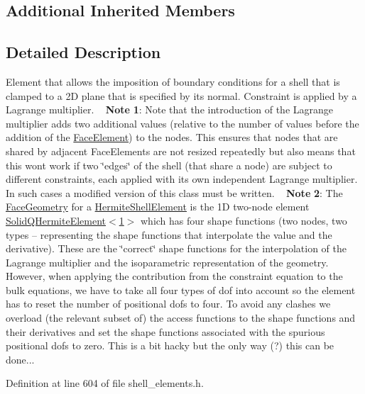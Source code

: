 \subsection*{Additional Inherited Members}


\subsection{Detailed Description}
Element that allows the imposition of boundary conditions for a shell that is clamped to a 2D plane that is specified by its normal. Constraint is applied by a Lagrange multiplier. ~\newline
{\bfseries Note} {\bfseries 1}\+: Note that the introduction of the Lagrange multiplier adds two additional values (relative to the number of values before the addition of the \hyperlink{classoomph_1_1FaceElement}{Face\+Element}) to the nodes. This ensures that nodes that are shared by adjacent Face\+Elements are not resized repeatedly but also means that this won\textquotesingle{}t work if two \char`\"{}edges\char`\"{} of the shell (that share a node) are subject to different constraints, each applied with its own independent Lagrange multiplier. In such cases a modified version of this class must be written. ~\newline
 {\bfseries Note} {\bfseries 2}\+: The \hyperlink{classoomph_1_1FaceGeometry}{Face\+Geometry} for a \hyperlink{classoomph_1_1HermiteShellElement}{Hermite\+Shell\+Element} is the 1D two-\/node element \hyperlink{classoomph_1_1SolidQHermiteElement}{Solid\+Q\+Hermite\+Element$<$1$>$} which has four shape functions (two nodes, two types -- representing the shape functions that interpolate the value and the derivative). These are the \char`\"{}correct\char`\"{} shape functions for the interpolation of the Lagrange multiplier and the isoparametric representation of the geometry. However, when applying the contribution from the constraint equation to the bulk equations, we have to take all four types of dof into account so the element has to reset the number of positional dofs to four. To avoid any clashes we overload (the relevant subset of) the access functions to the shape functions and their derivatives and set the shape functions associated with the spurious positional dofs to zero. This is a bit hacky but the only way (?) this can be done... 

Definition at line 604 of file shell\+\_\+elements.\+h.



